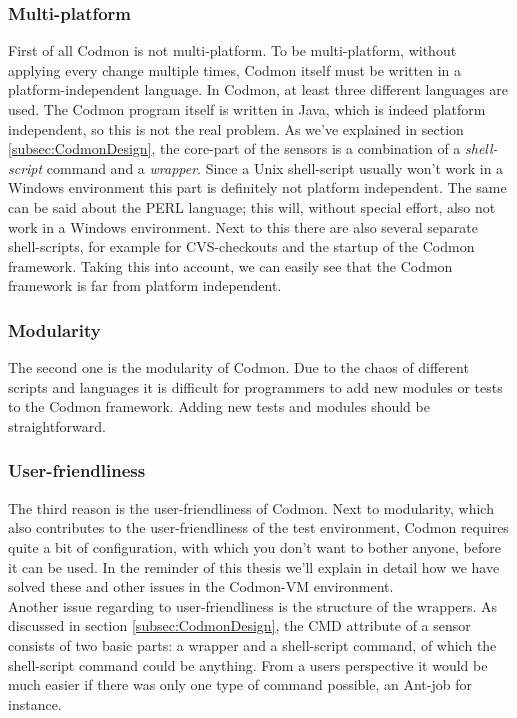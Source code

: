 \documentclass{article}
\newcommand{\project}{Codmon-VM}
\begin{document}
\subsubsection{Multi-platform}
\label{prob:multi}
First of all Codmon is not multi-platform. To be multi-platform, without applying every change multiple times, Codmon itself must be written in a platform-independent language. 
In Codmon, at least three different languages are used. The Codmon program itself is written in Java, which is indeed platform independent\cite{Java}, so this is not the real problem. As we've explained in 
section \ref{subsec:CodmonDesign}, the core-part of the sensors is a combination of a \emph{shell-script} command and a \emph{wrapper}. Since a Unix shell-script usually won't work in a Windows environment 
this part is definitely not platform independent. The same can be said about the PERL language; this will, without special effort, also not work in a Windows environment. Next to this there are also several 
separate shell-scripts, for example for  CVS-checkouts and the startup of the Codmon framework. Taking this into account, we can easily see that the Codmon framework is far from platform independent.

\subsubsection{Modularity}
\label{prob:modular} 
The second one is the modularity of Codmon. Due to the chaos of different scripts and languages it is difficult for programmers to add new modules or tests to the Codmon framework. Adding new tests and modules 
should be straightforward. 

\subsubsection{User-friendliness}
\label{prob:user}
The third reason is the user-friendliness of Codmon. Next to modularity, which also contributes to the user-friendliness of the test environment, Codmon requires quite a bit of configuration, with 
which you don't want to bother anyone, before it can be used. In the reminder of this thesis we'll explain in detail how we have solved these and other issues in the \project{} environment.\\
 
\noindent Another issue regarding to user-friendliness is the structure of the wrappers. As discussed in section \ref{subsec:CodmonDesign}, the CMD attribute of a sensor consists of two basic parts: 
a wrapper and a shell-script command, of which the shell-script command could be anything. From a users perspective it would be much easier if there was only one type of command possible, an Ant-job\cite{Ant} 
for instance.\\
\end{document}
